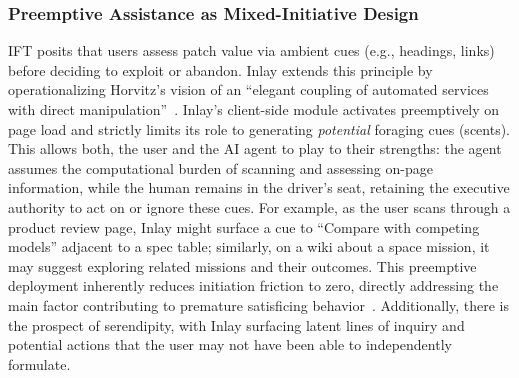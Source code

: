 \documentclass[sigconf]{acmart}
\begin{document}

\subsubsection{Preemptive Assistance as Mixed-Initiative Design}
IFT posits that users assess patch value via ambient cues (e.g., headings, links) before deciding to exploit or abandon. Inlay extends this principle by operationalizing Horvitz's vision of an ``elegant coupling of automated services with direct manipulation''~\cite{horvitz1999}. 
Inlay's client-side module activates preemptively on page load and strictly limits its role to generating \emph{potential} foraging cues (scents). This allows both, the user and the AI agent to play to their strengths: the agent assumes the computational burden of scanning and assessing on-page information, while the human remains in the driver's seat, retaining the executive authority to act on or ignore these cues.
For example, as the user scans through a product review page, Inlay might surface a cue to ``Compare with competing models'' adjacent to a spec table; similarly, on a wiki about a space mission, it may suggest exploring related missions and their outcomes. This preemptive deployment inherently reduces initiation friction to zero, directly addressing the main factor contributing to premature satisficing behavior~\cite{AgostoYoung}. Additionally, there is the prospect of serendipity, with Inlay surfacing latent lines of inquiry and potential actions that the user may not have been able to independently formulate.
\end{document}
